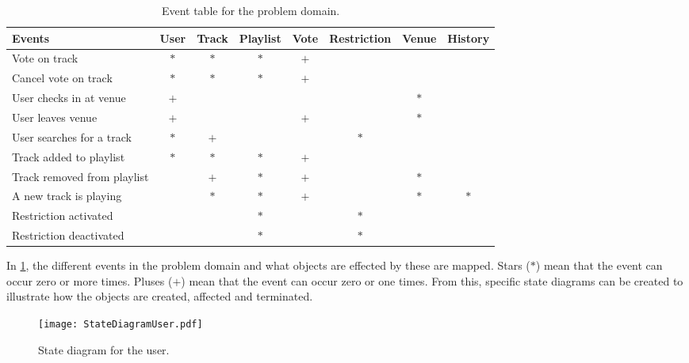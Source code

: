 \begin{table}[htbp]
    \centering
    \tabcolsep=0.10cm
    \begin{tabular}{lccccccc}
        \toprule
        \textbf{Events}                 & User   & Track  & Playlist & Vote   & Restriction & Venue  & History\\
        \midrule
        Vote on track                   & $\ast$ & $\ast$ & $\ast$   & $+$    &             &        &        \\
        Cancel vote on track            & $\ast$ & $\ast$ & $\ast$   & $+$    &             &        &        \\
        User checks in at venue         & $+$    &        &          &        &             & $\ast$ &        \\
        User leaves venue               & $+$    &        &          & $+$    &             & $\ast$ &        \\
        User searches for a track       & $\ast$ & $+$    &          &        & $\ast$      &        &        \\
        Track added to playlist         & $\ast$ & $\ast$ & $\ast$   & $+$    &             &        &        \\
        Track removed from playlist     &        & $+$    & $\ast$   & $+$    &             & $\ast$ &        \\
        A new track is playing          &        & $\ast$ & $\ast$   & $+$    &             & $\ast$ & $\ast$ \\
        Restriction activated           &        &        & $\ast$   &        & $\ast$      &        &        \\
        Restriction deactivated         &        &        & $\ast$   &        & $\ast$      &        &        \\
        \bottomrule
    \end{tabular}
    \caption{Event table for the problem domain.}\label{eventtable}
\end{table}

In \cref{eventtable}, the different events in the problem domain and
what objects are effected by these are mapped. Stars ($\ast$) mean that the
event can occur zero or more times. Pluses ($+$) mean that the event can
occur zero or one times. From this, specific state diagrams can be created to illustrate how the objects are created, affected and terminated.

\begin{figure}[H]
  \centering
  \texttt{[image: StateDiagramUser.pdf]}
  \caption{State diagram for the user.}\label{fig:StateDiagramUser}
\end{figure}

